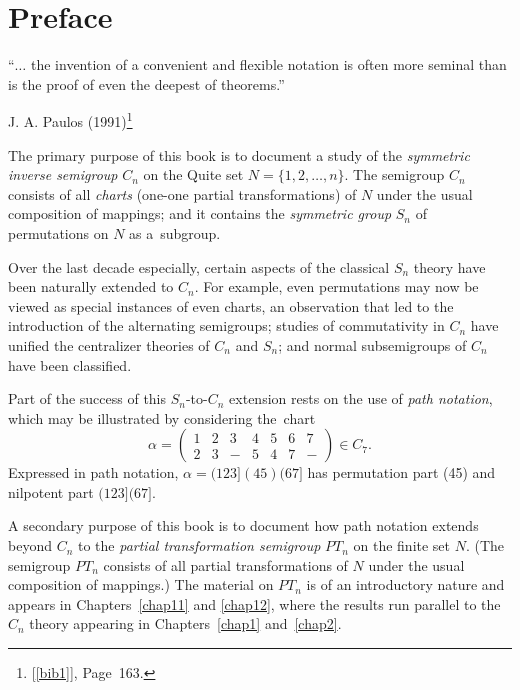 \documentclass{surv-l}
\numberwithin{equation}{section}
\numberwithin{table}{section}
\numberwithin{figure}{section}
\theoremstyle{plain}
\theoremstyle{definition}
\begin{document}
\frontmatter


\tableofcontents

\mainmatter

\chapter*{Preface}

\epigraph{``$\ldots$ the invention of a convenient and flexible
notation is often more seminal than is the proof
of even the deepest of theorems.''}{J. A. Paulos (1991)\footnote{[\ref{bib1}], Page~163.}}

The primary purpose of this book is to document a study of the
\emph{symmetric inverse
semigroup} $C_{n}$ on the Quite set
$N=\{1,2,\ldots,n\}$. The semigroup $C_{n}$ consists of all
\emph{charts} (one-one partial transformations) of $N$ under the usual composition of
mappings; and it contains the \emph{symmetric group} $S_{n}$ of
permutations on $N$ as a~subgroup.

Over the last decade especially, certain aspects of the classical
$S_{n}$ theory have been naturally extended to $C_{n}$. For
example, even permutations may now be viewed as special instances
of even charts, an observation that led to the introduction of the
alternating semigroups; studies of commutativity in $C_{n}$ have
unified the centralizer theories of $C_{n}$ and $S_{n}$; and
normal subsemigroups of $C_{n}$ have been classified.

Part of the success of this $S_{n}$-to-$C_{n}$ extension rests on
the use of \emph{path notation}, which may be
illustrated by considering the~chart
\[
\alpha=\left(\begin{matrix}
1 & 2 & 3 & 4 & 5 & 6 & 7\\
2 & 3 & - & 5 & 4 & 7 & -
\end{matrix}\right)\in C_{7}.
\]
Expressed in path notation, $\alpha=(123](45)(67]$ has permutation
part (45) and nilpotent part $(123](67]$.

A secondary purpose of this book is to document how path notation
extends beyond $C_{n}$ to the \emph{partial transformation
semigroup} $PT_{n}$ on the finite
set $N$. (The semigroup $PT_{n}$ consists of all partial
transformations of $N$ under the usual composition of mappings.)
The material on $PT_{n}$ is of an introductory nature and appears
in Chapters~\ref{chap11} and \ref{chap12}, where the results run
parallel to the $C_{n}$ theory appearing in Chapters~\ref{chap1}
and~\ref{chap2}.
\end{document}
